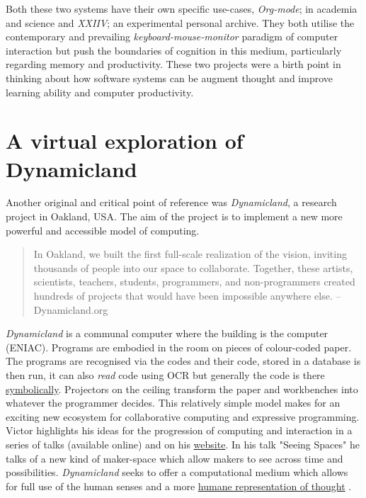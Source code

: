\documentclass[12pt]{report}
\begin{document}
Both these two systems have their own specific use-cases, \emph{Org-mode}; in
academia and science and \emph{XXIIV}; an experimental personal archive. They both
utilise the contemporary and prevailing \emph{keyboard-mouse-monitor} paradigm
of computer interaction but push the boundaries of cognition in this medium,
particularly regarding memory and productivity. These two projects were a birth
point in thinking about how software systems can be augment thought and improve
learning ability and computer productivity.


\section{A virtual exploration of Dynamicland}
\label{sec:org210fadc}

Another original and critical point of reference was \emph{Dynamicland}, a research
project in Oakland, USA. The aim of the project is to implement a new more
powerful and accessible model of computing.

\begin{quote}


In Oakland, we built the first full-scale realization of the vision, inviting
thousands of people into our space to collaborate. Together, these artists,
scientists, teachers, students, programmers, and non-programmers created
hundreds of projects that would have been impossible anywhere else.
-- Dynamicland.org 
\end{quote}


\emph{Dynamicland} is a communal computer where the building is the computer (ENIAC).
Programs are embodied in the room on pieces of colour-coded paper. The programs
are recognised via the codes and their code, stored in a database is then run,
it can also \emph{read} code using OCR but generally the code is there \href{https://thenewstack.io/dynamicland-rethinks-computer-interfaces/}{symbolically}.
Projectors on the ceiling transform the paper and workbenches into whatever the
programmer decides. This relatively simple model makes for an exciting new
ecosystem for collaborative computing and expressive programming. Victor
highlights his ideas for the progression of computing and interaction in a
series of talks (available online) and on his \href{http://worrydream.com}{website}. In his talk "Seeing
Spaces" he talks of a new kind of maker-space which allow makers to see across
time and possibilities. \emph{Dynamicland} seeks to offer a computational medium
which allows for full use of the human senses and a more \href{https://vimeo.com/115154289}{humane representation
of thought} \cite{VictorKayDynamicLand}. \\
\end{document}
